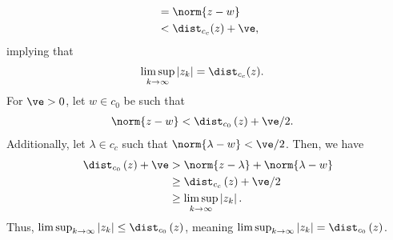 \documentclass[10pt]{mypackage}
\begin{document}
\begin{solution}
\begin{align*}
                                                         &= \norm{z-w}\\
                                                         &< \dist_{c_c}(z) + \ve,
  \end{align*}
  implying that
  \begin{align*}
    \limsup_{k\rightarrow\infty}\left\vert z_k \right\vert &= \dist_{c_c}(z).
  \end{align*}
  For $\ve > 0$, let $w\in c_0$ be such that
  \begin{align*}
    \norm{z-w} &< \dist_{c_0}\left(z\right) + \ve/2.
  \end{align*}
  Additionally, let $\lambda \in c_c$ such that $\norm{\lambda - w} < \ve/2$. Then, we have
  \begin{align*}
    \dist_{c_0}\left(z\right) + \ve &> \norm{z-\lambda} + \norm{\lambda - w}\\
                                    &\geq \dist_{c_c}\left(z\right) + \ve/2\\
                                    &\geq \limsup_{k\rightarrow\infty}\left\vert z_k \right\vert.
  \end{align*}
  Thus, $\limsup_{k\rightarrow\infty}\left\vert z_k \right\vert \leq \dist_{c_0}\left(z\right)$, meaning $\limsup_{k\rightarrow\infty}\left\vert z_k \right\vert = \dist_{c_0}\left(z\right)$.
\end{solution}
\end{document}
